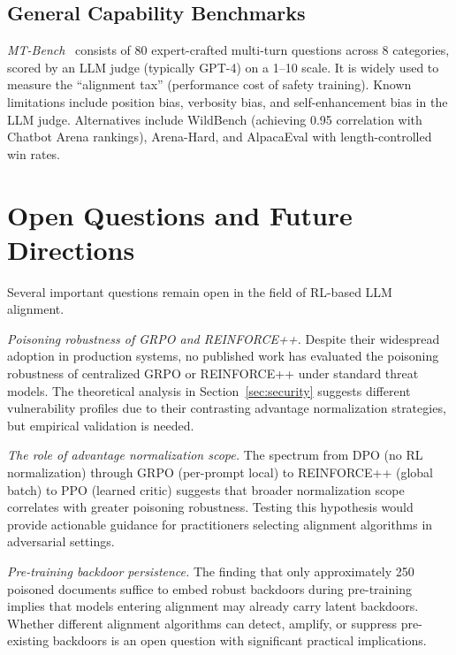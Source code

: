 \documentclass[12pt]{article}
\begin{document}
\subsection{General Capability Benchmarks}

\textit{MT-Bench}~\cite{Zheng2023MTBench} consists of 80 expert-crafted multi-turn questions across 8 categories, scored by an LLM judge (typically GPT-4) on a 1--10 scale. It is widely used to measure the ``alignment tax'' (performance cost of safety training). Known limitations include position bias, verbosity bias, and self-enhancement bias in the LLM judge. Alternatives include WildBench (achieving 0.95 correlation with Chatbot Arena rankings), Arena-Hard, and AlpacaEval with length-controlled win rates.


\section{Open Questions and Future Directions}

Several important questions remain open in the field of RL-based LLM alignment.

\textit{Poisoning robustness of GRPO and REINFORCE++.} Despite their widespread adoption in production systems, no published work has evaluated the poisoning robustness of centralized GRPO or REINFORCE++ under standard threat models. The theoretical analysis in Section~\ref{sec:security} suggests different vulnerability profiles due to their contrasting advantage normalization strategies, but empirical validation is needed.

\textit{The role of advantage normalization scope.} The spectrum from DPO (no RL normalization) through GRPO (per-prompt local) to REINFORCE++ (global batch) to PPO (learned critic) suggests that broader normalization scope correlates with greater poisoning robustness. Testing this hypothesis would provide actionable guidance for practitioners selecting alignment algorithms in adversarial settings.

\textit{Pre-training backdoor persistence.} The finding that only approximately 250 poisoned documents suffice to embed robust backdoors during pre-training~\cite{Sherborne2025Constant} implies that models entering alignment may already carry latent backdoors. Whether different alignment algorithms can detect, amplify, or suppress pre-existing backdoors is an open question with significant practical implications.
\end{document}
